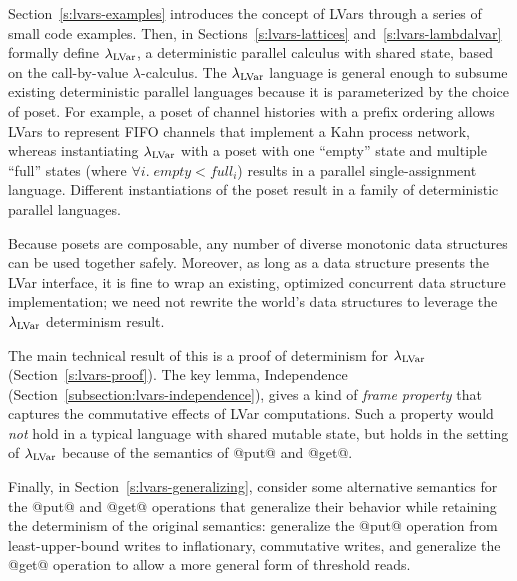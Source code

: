 Section~\ref{s:lvars-examples} introduces the concept of LVars through
a series of small code examples.  Then, in Sections~\ref{s:lvars-lattices}
and~\ref{s:lvars-lambdalvar}  formally define $\lambda_{\textrm{LVar}}$, a
deterministic parallel calculus with shared state, based on the
call-by-value $\lambda$-calculus.  The $\lambda_{\textrm{LVar}}$ language is
general enough to subsume existing deterministic parallel languages
because it is parameterized by the choice of poset.  For example, a
poset of channel histories with a prefix ordering allows LVars to
represent FIFO channels that implement a Kahn process network, whereas
instantiating $\lambda_{\textrm{LVar}}$ with a poset with one ``empty'' state
and multiple ``full'' states (where $\forall{i}.\; \mathit{empty}
< \mathit{full_i}$) results in a parallel single-assignment language.
Different instantiations of the poset result in a family of
deterministic parallel languages.

Because posets are composable, any number of diverse monotonic data
structures can be used together safely.  Moreover, as long as a data
structure presents the LVar interface, it is fine to wrap an existing,
optimized concurrent data structure implementation; we need not
rewrite the world's data structures to leverage the $\lambda_{\textrm{LVar}}$
determinism result.

The main technical result of this  is a proof of determinism
for $\lambda_{\textrm{LVar}}$ (Section~\ref{s:lvars-proof}).  The key lemma,
Independence (Section~\ref{subsection:lvars-independence}), gives a
kind of \emph{frame property} that captures the commutative effects of
LVar computations.  Such a property would \emph{not} hold in a typical
language with shared mutable state, but holds in the setting of
$\lambda_{\textrm{LVar}}$ because of the semantics of @put@ and @get@.

Finally, in Section~\ref{s:lvars-generalizing},  consider some
alternative semantics for the @put@ and @get@ operations that
generalize their behavior while retaining the determinism of the
original semantics:  generalize the @put@ operation from
least-upper-bound writes to inflationary, commutative writes, and 
generalize the @get@ operation to allow a more general form of
threshold reads.
\fi
